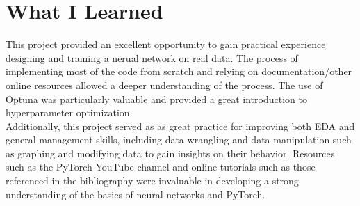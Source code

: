\documentclass{article}[12pt]
\begin{document}
\section*{What I Learned}

This project provided an excellent opportunity to gain practical experience designing and training a nerual network on real data. The process of implementing most of the code from scratch and relying on documentation/other online resources allowed a deeper understanding of the process. The use of Optuna \cite{optuna_2019} was particularly valuable and provided a great introduction to hyperparameter optimization.\\
\indent
Additionally, this project served as as great practice for improving both EDA and general management skills, including data wrangling and data manipulation such as graphing and modifying data to gain insights on their behavior. Resources such as the PyTorch YouTube channel and online tutorials such as those referenced in the bibliography were invaluable in developing a strong understanding of the basics of neural networks and PyTorch.\\




\end{document}
